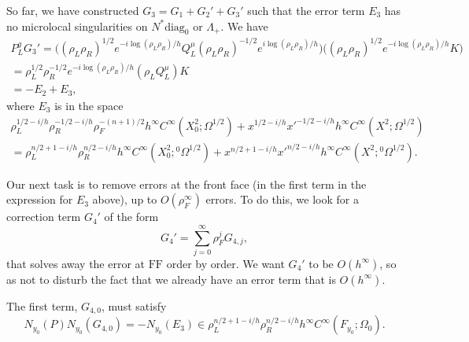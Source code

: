 \documentclass[10pt, a4paper, twoside]{amsart}
\numberwithin{equation}{section}
\theoremstyle{remark}
\begin{document}
So far, we have constructed $G_3 = G_1 + G_2' + G_3'$ such that the error term $E_3$ has no microlocal singularities on $N^* {\mathrm{diag}_0}$ or $\Lambda_+$. We have 
\begin{equation}\begin{gathered}
P_L^g G_3'  =  \bigg( (\rho_L \rho_R)^{1/2} e^{-i\log(\rho_L \rho_R)/h} Q_L^\mu (\rho_L \rho_R)^{-1/2} e^{i\log(\rho_L \rho_R)/h} \bigg) \bigg( (\rho_L \rho_R)^{1/2} e^{-i\log(\rho_L \rho_R)/h} K \bigg) \\
= \rho_L^{1/2} \rho_R^{-1/2} e^{-i\log(\rho_L \rho_R)/h} (\rho_L Q_L^\mu) K \\
= -E_2 + E_3, 
\end{gathered}\end{equation}
where $E_3$ is in the space 
\begin{equation}\begin{gathered}
 \rho_L^{1/2-i/h} \rho_R^{-1/2-i/h} \rho_F^{-(n+1)/2} h^\infty C^\infty(X^2_0; \Omega^{1/2}) + x^{1/2-i/h} {x'}^{-1/2-i/h} h^\infty C^\infty(X^2; \Omega^{1/2}) \\
=   \rho_L^{n/2+1-i/h} \rho_R^{n/2-i/h}h^\infty C^\infty(X^2_0; {{}^0\Omega^{1/2}}) + x^{n/2+1-i/h} {x'}^{n/2-i/h} h^\infty C^\infty(X^2; {{}^0\Omega^{1/2}}) . 
\end{gathered}\end{equation}

Our next task is to remove errors at the front face (in the first term in the expression for $E_3$ above), up to $O(\rho_F^\infty)$ errors. To do this, we look for a correction term $G_4'$ of the form 
$$
G_4' = \sum_{j=0}^\infty \rho_F^j G_{4, j},
$$
that solves away the error at ${\mathrm{FF}}$ order by order. We want $G_4'$ to be $O(h^\infty)$, so as not to disturb the fact that we already have an error term that is $O(h^\infty)$. 

The first term, $G_{4, 0}$, must satisfy
\begin{equation}
N_{y_0}(P) N_{y_0}(G_{4, 0}) = -N_{y_0} (E_3) \in \rho_{L}^{n/2 + 1 -i/h} \rho_R^{n/2 -i/h} h^\infty C^\infty(F_{y_0}; \Omega_0).
\end{equation}
\end{document}
